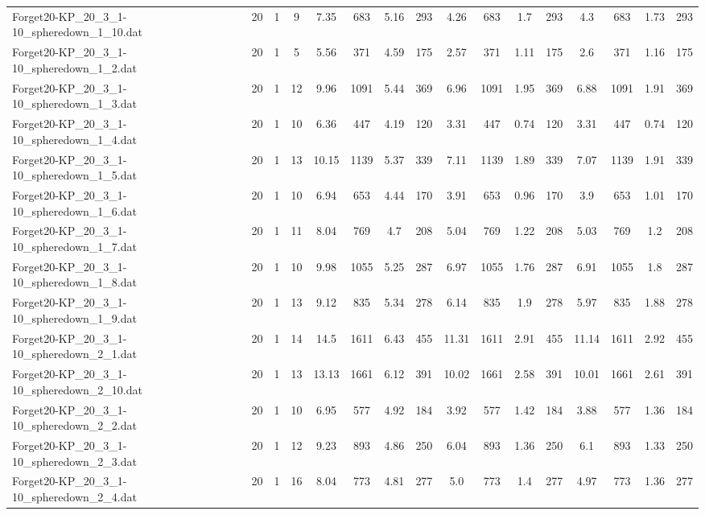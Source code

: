 \begin{sidewaystable}[!ht]
{\begin{tabular}{lccccccccccccccc}
Forget20-KP\_20\_3\_1-10\_spheredown\_1\_10.dat & 20 & 1 & 9 & 7.35 & 683 & 5.16 & 293 & 4.26 & 683 & 1.7 & 293 & 4.3 & 683 & 1.73 & 293 \\
Forget20-KP\_20\_3\_1-10\_spheredown\_1\_2.dat & 20 & 1 & 5 & 5.56 & 371 & 4.59 & 175 & 2.57 & 371 &  \textcolor{blue2}{1.11} & 175 & 2.6 & 371 & 1.16 & 175 \\
Forget20-KP\_20\_3\_1-10\_spheredown\_1\_3.dat & 20 & 1 & 12 & 9.96 & 1091 & 5.44 & 369 & 6.96 & 1091 & 1.95 & 369 & 6.88 & 1091 & 1.91 & 369 \\
Forget20-KP\_20\_3\_1-10\_spheredown\_1\_4.dat & 20 & 1 & 10 & 6.36 & 447 & 4.19 & 120 & 3.31 & 447 &  \textcolor{blue2}{0.74} & 120 & 3.31 & 447 &  \textcolor{blue2}{0.74} & 120 \\
Forget20-KP\_20\_3\_1-10\_spheredown\_1\_5.dat & 20 & 1 & 13 & 10.15 & 1139 & 5.37 & 339 & 7.11 & 1139 & 1.89 & 339 & 7.07 & 1139 & 1.91 & 339 \\
Forget20-KP\_20\_3\_1-10\_spheredown\_1\_6.dat & 20 & 1 & 10 & 6.94 & 653 & 4.44 & 170 & 3.91 & 653 &  \textcolor{blue2}{0.96} & 170 & 3.9 & 653 & 1.01 & 170 \\
Forget20-KP\_20\_3\_1-10\_spheredown\_1\_7.dat & 20 & 1 & 11 & 8.04 & 769 & 4.7 & 208 & 5.04 & 769 & 1.22 & 208 & 5.03 & 769 & 1.2 & 208 \\
Forget20-KP\_20\_3\_1-10\_spheredown\_1\_8.dat & 20 & 1 & 10 & 9.98 & 1055 & 5.25 & 287 & 6.97 & 1055 & 1.76 & 287 & 6.91 & 1055 & 1.8 & 287 \\
Forget20-KP\_20\_3\_1-10\_spheredown\_1\_9.dat & 20 & 1 & 13 & 9.12 & 835 & 5.34 & 278 & 6.14 & 835 & 1.9 & 278 & 5.97 & 835 & 1.88 & 278 \\
Forget20-KP\_20\_3\_1-10\_spheredown\_2\_1.dat & 20 & 1 & 14 & 14.5 & 1611 & 6.43 & 455 & 11.31 & 1611 & 2.91 & 455 & 11.14 & 1611 & 2.92 & 455 \\
Forget20-KP\_20\_3\_1-10\_spheredown\_2\_10.dat & 20 & 1 & 13 & 13.13 & 1661 & 6.12 & 391 & 10.02 & 1661 & 2.58 & 391 & 10.01 & 1661 & 2.61 & 391 \\
Forget20-KP\_20\_3\_1-10\_spheredown\_2\_2.dat & 20 & 1 & 10 & 6.95 & 577 & 4.92 & 184 & 3.92 & 577 & 1.42 & 184 & 3.88 & 577 & 1.36 & 184 \\
Forget20-KP\_20\_3\_1-10\_spheredown\_2\_3.dat & 20 & 1 & 12 & 9.23 & 893 & 4.86 & 250 & 6.04 & 893 & 1.36 & 250 & 6.1 & 893 &  \textcolor{blue2}{1.33} & 250 \\
Forget20-KP\_20\_3\_1-10\_spheredown\_2\_4.dat & 20 & 1 & 16 & 8.04 & 773 & 4.81 & 277 & 5.0 & 773 & 1.4 & 277 & 4.97 & 773 &  \textcolor{blue2}{1.36} & 277 \\

\end{tabular}}
\end{sidewaystable}

